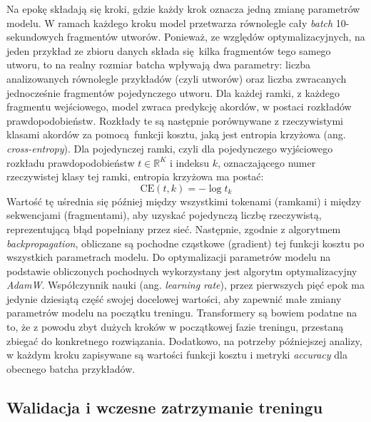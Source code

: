 Na epokę składają się kroki, gdzie każdy krok oznacza jedną zmianę parametrów modelu. W ramach
każdego kroku model przetwarza równolegle cały \emph{batch} 10-sekundowych fragmentów utworów.
Ponieważ, ze względów optymalizacyjnych, na jeden przykład ze zbioru danych składa się kilka
fragmentów tego samego utworu, to na realny rozmiar batcha wpływają dwa parametry: liczba
analizowanych równolegle przykładów (czyli utworów) oraz liczba zwracanych jednocześnie fragmentów
pojedynczego utworu. Dla każdej ramki, z każdego fragmentu wejściowego, model zwraca predykcję akordów, w
postaci rozkładów prawdopodobieństw. Rozkłady te są następnie porównywane z rzeczywistymi klasami
akordów za pomocą funkcji kosztu, jaką jest entropia krzyżowa (ang. \emph{cross-entropy}). Dla
pojedynczej ramki, czyli dla pojedynczego wyjściowego rozkładu prawdopodobieństw $t \in
\mathbb{R}^K$ i indeksu $k$, oznaczającego numer rzeczywistej klasy tej ramki, entropia krzyżowa ma
postać:
\begin{equation}
    \textrm{CE}(t, k) = - \log t_k
\end{equation}
Wartość tę uśrednia się później między wszystkimi tokenami (ramkami) i między sekwencjami
(fragmentami), aby uzyskać pojedynczą liczbę rzeczywistą, reprezentującą błąd popełniany przez sieć.
Następnie, zgodnie z algorytmem \emph{backpropagation}, obliczane są pochodne cząstkowe (gradient)
tej funkcji kosztu po wszystkich parametrach modelu. Do optymalizacji parametrów modelu na podstawie
obliczonych pochodnych wykorzystany jest algorytm optymalizacyjny \emph{AdamW}. Współczynnik nauki
(ang. \emph{learning rate}), przez pierwszych pięć epok ma jedynie dziesiątą część swojej docelowej
wartości, aby zapewnić małe zmiany parametrów modelu na początku treningu. Transformery są bowiem
podatne na to, że z powodu zbyt dużych kroków w początkowej fazie treningu, przestaną zbiegać do
konkretnego rozwiązania. Dodatkowo, na potrzeby późniejszej analizy, w każdym kroku zapisywane są
wartości funkcji kosztu i metryki \emph{accuracy} dla obecnego batcha przykładów.

\subsection{Walidacja i wczesne zatrzymanie treningu}


